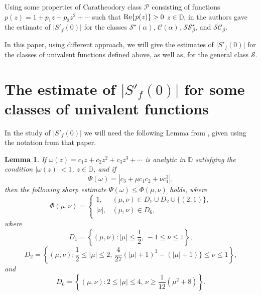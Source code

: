 \documentclass{amsart}
\newtheorem{lem}{Lemma}
\newcommand{\ID}{{\mathbb D}}
\newcommand{\D}{{\mathbb D}}
\begin{document}
\medskip

Using some properties of Caratheodory class $\mathcal{P}$ consisting of functions $p(z)= 1+p_{1}z+p_{2}z^{2}+\cdots$ such that ${\rm Re}\{p(z)\}>0$ $z\in \ID$, in \cite{QW} the authors gave the estimate of $|S'_{f}(0)|$ for the classes $\mathcal{S}^{\star}(\alpha)$, $\mathcal{C}(\alpha)$, $\mathcal{S}\mathcal{S}^{\star}_{\beta}$, and  $\mathcal{S}\mathcal{C}_{\beta}$.

\medskip

In this paper, using different approach, we will give the estimates of $|S'_{f}(0)|$ for the classes of univalent functions defined above, as well as, for the general class $\mathcal{S}$.

\medskip

\section{The estimate of $|S'_{f}(0)|$ for some classes of univalent functions}

\medskip

In the study of $|S'_{f}(0)|$ we will need the following Lemma from \cite{126}, given using the notation from that paper.

\medskip

\begin{lem}\label{lem-1} If $\omega(z)=c_{1}z+c_2z^2+c_3z^3+\cdots $ is analytic in $\D$ satisfying the condition
$|\omega(z)|<1$, $z\in\D $, and if
$$ \Psi(\omega)=|c_{3}+\mu c_{1}c_{2}+\nu c_{1}^{3}|,$$
then the following sharp estimate $\Psi(\omega)\leq \Phi(\mu, \nu)$ holds, where
\[\Phi(\mu,\nu)=
\begin{cases}
1, & (\mu,\nu)\in D_{1}\cup D_{2}\cup\{(2,1)\},\\
|\nu|, & (\mu,\nu)\in D_{6},\\
\end{cases}\]
where
$$D_{1}=\left\{(\mu, \nu): |\mu|\leq\frac{1}{2},\,-1\leq\nu\leq 1\right\} ,$$
$$D_{2}=\left\{(\mu, \nu): \frac{1}{2}\leq |\mu|\leq 2,\,\frac{4}{27}(|\mu|+1)^{3}-(|\mu|+1)\}\leq\nu\leq 1 \right\},$$
and
$$D_{6}=\left\{(\mu, \nu): 2\leq|\mu|\leq4,\,\nu\geq\frac{1}{12}(\mu^{2}+8)\right\}.$$
\end{lem}

\medskip
\end{document}
